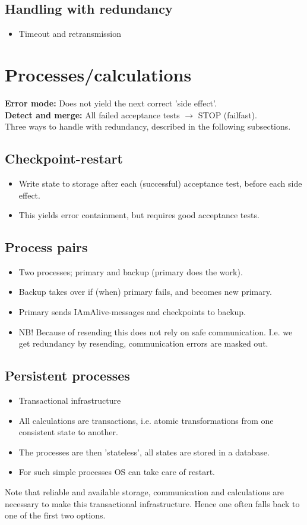 \subsection{Handling with redundancy}
\begin{itemize}
    \item Timeout and retransmission
\end{itemize}

\section{Processes/calculations}
\textbf{Error mode:} Does not yield the next correct 'side effect'.\\
\textbf{Detect and merge:} All failed acceptance tests $\rightarrow$ STOP (failfast).\\
Three ways to handle with redundancy, described in the following subsections.

\subsection{Checkpoint-restart}
\begin{itemize}
    \item Write state to storage after each (successful) acceptance test, before each side effect.
    \item This yields error containment, but requires good acceptance tests.
\end{itemize}
\subsection{Process pairs}
\begin{itemize}
    \item Two processes; primary and backup (primary does the work).
    \item Backup takes over if (when) primary fails, and becomes new primary.
    \item Primary sends IAmAlive-messages and checkpoints to backup.
    \item NB! Because of resending this does not rely on safe communication. I.e. we get redundancy by resending, communication errors are masked out.
\end{itemize}

\subsection{Persistent processes}
\begin{itemize}
    \item Transactional infrastructure
    \item All calculations are transactions, i.e. atomic transformations from one consistent state to another.
    \item The processes are then 'stateless', all states are stored in a database.
    \item For such simple processes OS can take care of restart.
\end{itemize}
Note that reliable and available storage, communication and calculations are necessary to make this transactional infrastructure. Hence one often falls back to one of the first two options.
